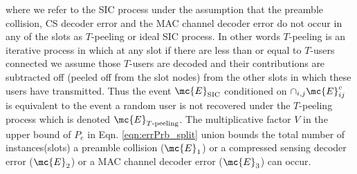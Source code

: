 \documentclass[final,onecolumn,12pt]{IEEEtran}
\begin{document}
where we refer to the SIC process under the assumption that the preamble collision, CS decoder error and the MAC channel decoder error do not occur in any of the slots as $T$-peeling or ideal SIC process. In other words $T$-peeling is an iterative process in which at any slot if there are less than or equal to $T$-users connected we assume those $T$-users are decoded and their contributions are subtracted off (peeled off from the slot nodes) from the other slots in which these users have transmitted. Thus the event $\mc{E}_{\text{SIC}}$ conditioned on $\cap_{i,j}\mc{E}^c_{ij}$ is equivalent to the event a random user is not recovered under the $T$-peeling process which is denoted $\mc{E}_{T\text{-peeling}}$. The multiplicative factor $V$ in the upper bound of $P_e$ in Eqn. \eqref{eqn:errPrb_split} union bounds the total number of instances(slots) a preamble collision ($\mc{E}_1$) or a compressed sensing decoder error ($\mc{E}_2$) or a MAC channel decoder error ($\mc{E}_3$) can occur.

\end{document}
